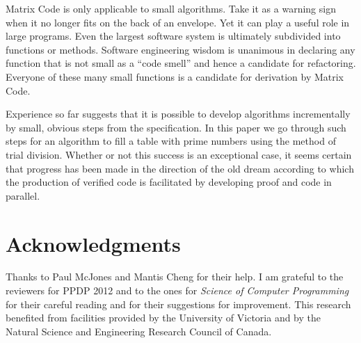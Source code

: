 \documentclass[preprint,11pt]{elsarticle}
\begin{document}
Matrix Code is only applicable to small algorithms.
Take it as a warning sign when it no longer fits on the back
of an envelope.
Yet it can play a useful role in large programs.
Even the largest software system is ultimately subdivided into
functions or methods.
Software engineering wisdom is unanimous in declaring
any function that is not small as a ``code smell''
and hence a candidate for refactoring.
Everyone of these many small functions
is a candidate for derivation by Matrix Code.

Experience so far suggests that it is possible
to develop algorithms incrementally
by small, obvious steps from the specification.
In this paper we go through such steps for
an algorithm to fill a table with prime numbers
using the method of trial division.
Whether or not this success is an exceptional case,
it seems certain that progress has been made in the direction
of the old dream according to which the production
of verified code is facilitated by developing
proof and code in parallel.  

\section*{Acknowledgments}
Thanks to Paul McJones and Mantis Cheng for their help.
I am grateful to the reviewers for PPDP 2012
and to the ones for \emph{Science of Computer Programming}
for their careful reading
and for their suggestions for improvement.
This research benefited from facilities provided
by the University of Victoria and by the Natural Science
and Engineering Research Council of Canada.
\end{document}
